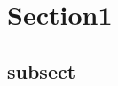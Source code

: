 \documentclass[a4paper,11pt]{article}
\date{}
\begin{document}
\section{Section1}
\subsection{subsect}
\end{document}
